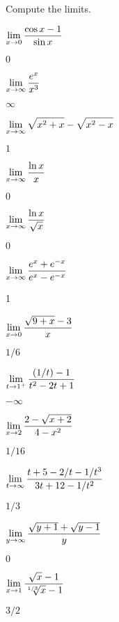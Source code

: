 \begin{exercises}

Compute the limits.

\twocol

\exercise $\displaystyle\lim_{x\to 0} {\cos x -1\over \sin x}$
\begin{answer} $0$
\end{answer}

\exercise $\displaystyle\lim_{x\to \infty} {e^x\over x^3}$
\begin{answer} $\infty$
\end{answer}

\exercise $\displaystyle\lim_{x\to \infty} \sqrt{x^2+x}-\sqrt{x^2-x}$
\begin{answer} $1$
\end{answer}

\exercise $\displaystyle\lim_{x\to \infty} {\ln x\over x}$
\begin{answer} $0$
\end{answer}

\exercise $\displaystyle\lim_{x\to \infty} {\ln x\over \sqrt{x}}$
\begin{answer} $0$
\end{answer}

\exercise $\displaystyle\lim_{x\to\infty} {e^x + e^{-x}\over e^x -e^{-x}}$
\begin{answer} 1
\end{answer}

\exercise $\displaystyle\lim_{x\to0}{\sqrt{9+x}-3\over x}$
\begin{answer} $1/6$
\end{answer}

\exercise $\displaystyle\lim_{t\to1^+}{(1/t)-1\over t^2-2t+1}$
\begin{answer} $-\infty$
\end{answer}

\exercise $\displaystyle\lim_{x\to2}{2-\sqrt{x+2}\over 4-x^2}$
\begin{answer} $1/16$
\end{answer}

\exercise $\displaystyle\lim_{t\to\infty}{t+5-2/t-1/t^3\over 3t+12-1/t^2}$
\begin{answer} $1/3$
\end{answer}

\exercise $\displaystyle\lim_{y\to\infty}{\sqrt{y+1}+\sqrt{y-1}\over y}$
\begin{answer} $0$
\end{answer}

\exercise $\ds\lim_{x\to1}{\sqrt{x}-1\over \root 1/3\of{x}-1}$
\begin{answer} $3/2$
\end{answer}


\end{exercises}
